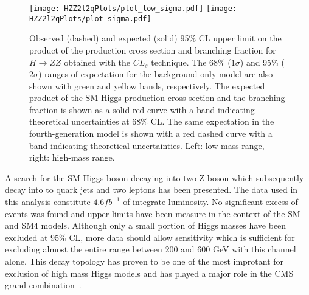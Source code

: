 \begin{figure}
\begin{center}
\texttt{[image: HZZ2l2qPlots/plot\_low\_sigma.pdf]}
\texttt{[image: HZZ2l2qPlots/plot\_sigma.pdf]}
\label{fig:HZZ2l2qLimitsSM4}
\caption{Observed (dashed) and expected (solid) 95\% CL upper limit on
the product of the production cross section and branching fraction for 
$H\to ZZ$ obtained with the $CL_s$ technique.  The 68\% ($1\sigma$) 
and 95\% ($2\sigma$) ranges of expectation for the background-only model
are also shown with green and yellow bands, respectively.  The expected
product of the SM Higgs production cross section and the branching
fraction is shown as a solid red curve with a band indicating theoretical
uncertainties at 68\% CL.  The same expectation in the fourth-generation
model is shown with a red dashed curve with a band indicating theoretical
uncertainties.  Left: low-mass range, right: high-mass range.  }
\end{center}
\end{figure}

A search for the SM Higgs boson decaying into two Z boson which
subsequently decay into to quark jets and two leptons has been presented.
The data used in this analysis constitute $4.6fb^{-1}$ of integrate
luminosity.  No significant excess of events was found and upper limits
have been measure in the context of the SM and SM4 models.  Although 
only a small portion of Higgs masses have been excluded at 95\% CL, 
more data should allow sensitivity which is sufficient for excluding almost
the entire range between 200 and 600 GeV with this channel alone.  
This decay topology has proven
to be one of the most improtant for exclusion of high mass Higgs models and
has played a major role in the CMS grand combination~\cite{???}. 

